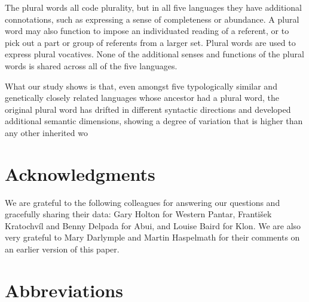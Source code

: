  The plural words all code plurality, but in all five languages they have additional connotations, such as expressing a sense of completeness or abundance. A plural word may also function to impose an individuated reading of a referent, or to pick out a part or group of referents from a larger set. Plural words are used to express plural vocatives. None of the additional senses and functions of the plural words is shared across all of the five languages.

 What our study shows is that, even amongst five typologically similar and genetically closely related languages whose ancestor had a plural word, the original plural word has drifted in different syntactic directions and developed additional semantic dimensions, showing a degree of variation that is higher than any other inherited wo


\section*{Acknowledgments}
We are grateful to the following colleagues for answering our questions and gracefully sharing their data: Gary Holton for Western Pantar, Franti\v{s}ek Kratochv\'il and Benny Delpada for Abui, and Louise Baird for Klon. We are also very grateful to Mary Darlymple and Martin Haspelmath for their comments on an earlier version of this paper.



\section*{Abbreviations}


